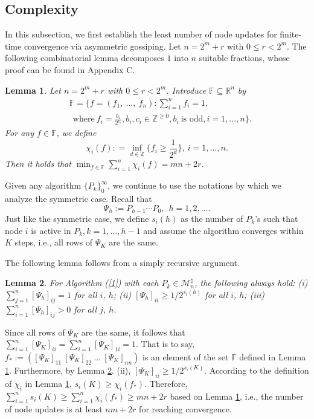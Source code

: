 \documentclass[a4paper, 11pt]{article}
\newtheorem{lemma}{Lemma}
\begin{document}
\subsection{Complexity}
In this subsection, we first establish the least number of node updates for finite-time convergence via asymmetric gossiping. Let $n=2^m+r$ with $0\leq r<2^m$.  The following combinatorial lemma  decomposes $1$ into $n$ suitable fractions, whose proof can be found in Appendix C.

\medskip

\begin{lemma}\label{lem3}
Let $n=2^m+r$ with $0\leq r<2^m$. Introduce $\mathbb{F}\subseteq \mathbb{R}^n$ by
\begin{align*}
& \mathbb{F}=\Big\{f=(f_1,\ ...,\ f_n):\sum_{i=1}^{n}f_i=1, \nonumber\\
&\ \ \text{where}\ f_i=\frac{b_i}{2^{c_i}}, b_i,c_i \in \mathbb{Z}^{\geq 0}, b_i\ \mbox{is odd}, i=1,...,n\Big\}.
\end{align*}
For any $f\in \mathbb{F}$, we define
$$
\chi_i(f): =\inf_{d\in \mathbb{Z}} \big\{ f_i\geq \frac{1}{2^{d}}\big\},\  i=1,\dots,n.
$$  Then it holds that  $\min_{f\in \mathbb{F}}\sum_{i=1}^{n}\chi_i(f) =mn+2r$.
\end{lemma}

\medskip

Given any algorithm $\{P_k\}_0^{\infty}$,
we continue to use the notations by which we analyze the symmetric case. Recall that
$$
\Psi_h:=P_{h-1}\cdots P_0, \ \ h=1, 2, \dots.
$$
Just like the symmetric case, we define
$
s_{i}(h) $ as the number of $P_k$'s such that node $i$ is active in $P_k, k=1,\dots,h-1$
and assume the algorithm converges within $K$ steps, i.e.,  all rows of $\Psi_K$ are the same.

The following lemma follows from a simply recursive argument.

\medskip

\begin{lemma}\label{case}
For Algorithm (\ref{1}) with each $P_k\in \mathscr{M}_n^\natural$, the following always hold: (i)  $\sum\limits_{j=1}^n[\Psi_h]_{ij}=1$ for all $i$, $h$; (ii)  $[\Psi_h]_{ii} \geq {1}/{2^{s_{i}(h)}}$ for all $i$, $h$; (iii) $\sum\limits_{i=1}^n[\Psi_h]_{ij}>0$ for all $j$, $h$.
\end{lemma}

\medskip

Since all rows of $\Psi_K$ are the same, it follows that $\sum_{i=1}^{n}[\Psi_K]_{ii}=\sum_{i=1}^{n}[\Psi_K]_{1i}=1$. That is to say, $f_\ast:=([\Psi_K]_{11}\ [\Psi_K]_{22} \ ... \ [\Psi_K]_{nn})$ is an element of the set $\mathbb{F}$ defined in Lemma \ref{lem3}. Furthermore, by Lemma \ref{case}. (ii), $[\Psi_K]_{ii} \geq {1}/{2^{s_{i}(K)}}$. According to the definition of $\chi_i$ in Lemma \ref{lem3}, $s_i(K)\geq \chi_i(f_\ast)$. Therefore,
$\sum_{i=1}^{n}s_i(K) \geq \sum_{i=1}^{n} \chi_i(f_\ast) \geq mn+2r$ based on Lemma \ref{lem3}, i.e., the number of node updates is at least $nm+2r$ for reaching convergence.
\end{document}
